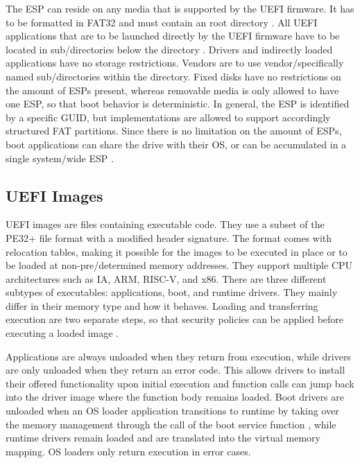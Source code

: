 The \ac{ESP} can reside on any media that is supported by the \ac{UEFI} firmware.
It has to be formatted in \ac{FAT}32 \cite[Section 13.3]{uefi-spec} and must contain an  root directory \cite[Section 13.3.1.3]{uefi-spec}.
All \ac{UEFI} applications that are to be launched directly by the \ac{UEFI} firmware have to be located in sub\-/directories below the  directory \cite[Section 13.3.1.3]{uefi-spec}.
Drivers and indirectly loaded applications have no storage restrictions.
Vendors are to use vendor\-/specifically named sub\-/directories within the  directory.
Fixed disks have no restrictions on the amount of \acp{ESP} present, whereas removable media is only allowed to have one \ac{ESP}, so that boot behavior is deterministic.
In general, the \ac{ESP} is identified by a specific \ac{GUID}, but implementations are allowed to support accordingly structured \ac{FAT} partitions.
Since there is no limitation on the amount of \acp{ESP}, boot applications can share the drive with their \ac{OS}, or can be accumulated in a single system\-/wide \ac{ESP} \cite[Section 13.3.3]{uefi-spec}.

\subsection{\acs{UEFI} Images}

\ac{UEFI} images are files containing executable code. They use a subset of the \ac{PE32}+ file format with a modified header signature.
The format comes with relocation tables, making it possible for the images to be executed in place or to be loaded at non-pre\-/determined memory addresses.
They support multiple CPU architectures such as IA, ARM, RISC-V, and x86.
There are three different subtypes of executables: applications, boot, and runtime drivers. They mainly differ in their memory type and how it behaves.
Loading and transferring execution are two separate steps, so that security policies can be applied before executing a loaded image \cite[Section 2.1.1]{uefi-spec}.

Applications are always unloaded when they return from execution, while drivers are only unloaded when they return an error code. This allows drivers to install their offered functionality upon initial execution and function calls can jump back into the driver image where the function body remains loaded.
Boot drivers are unloaded when an \ac{OS} loader application transitions to runtime by taking over the memory management through the call of the boot service function , while runtime drivers remain loaded and are translated into the virtual memory mapping. \ac{OS} loaders only return execution in error cases.

